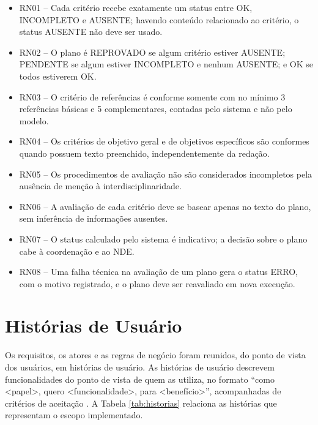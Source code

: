 \begin{itemize}
    \item RN01 -- Cada critério recebe exatamente um status entre OK, INCOMPLETO e AUSENTE; havendo conteúdo relacionado ao critério, o status AUSENTE não deve ser usado.
    \item RN02 -- O plano é REPROVADO se algum critério estiver AUSENTE; PENDENTE se algum estiver INCOMPLETO e nenhum AUSENTE; e OK se todos estiverem OK.
    \item RN03 -- O critério de referências é conforme somente com no mínimo 3 referências básicas e 5 complementares, contadas pelo sistema e não pelo modelo.
    \item RN04 -- Os critérios de objetivo geral e de objetivos específicos são conformes quando possuem texto preenchido, independentemente da redação.
    \item RN05 -- Os procedimentos de avaliação não são considerados incompletos pela ausência de menção à interdisciplinaridade.
    \item RN06 -- A avaliação de cada critério deve se basear apenas no texto do plano, sem inferência de informações ausentes.
    \item RN07 -- O status calculado pelo sistema é indicativo; a decisão sobre o plano cabe à coordenação e ao NDE.
    \item RN08 -- Uma falha técnica na avaliação de um plano gera o status ERRO, com o motivo registrado, e o plano deve ser reavaliado em nova execução.
\end{itemize}

\section{Histórias de Usuário}
\label{sec:historias}

Os requisitos, os atores e as regras de negócio foram reunidos, do ponto de vista dos usuários, em histórias de usuário. As histórias de usuário descrevem funcionalidades do ponto de vista de quem as utiliza, no formato ``como \textless papel\textgreater, quero \textless funcionalidade\textgreater, para \textless benefício\textgreater'', acompanhadas de critérios de aceitação \cite{Cohn2004}. A Tabela \ref{tab:historias} relaciona as histórias que representam o escopo implementado.

